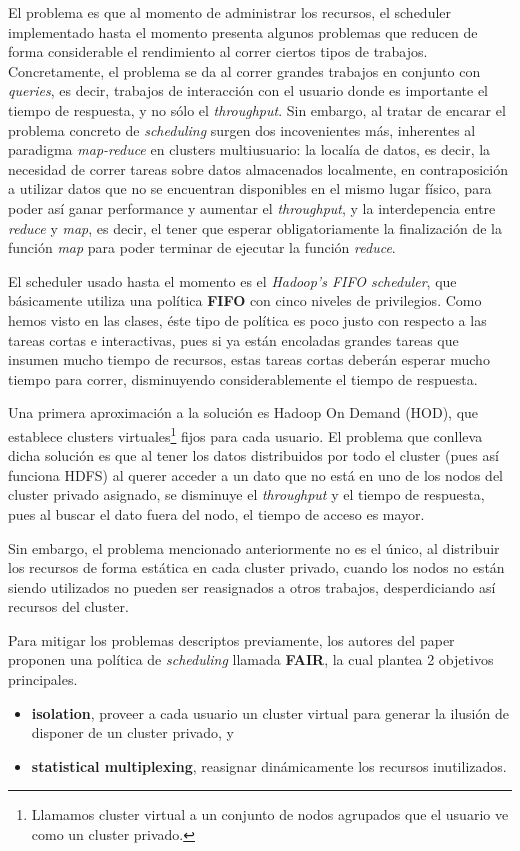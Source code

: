 \documentclass[a4paper]{article}
\begin{document}
El problema es que al momento de administrar los recursos, el scheduler
implementado hasta el momento presenta algunos problemas que reducen de forma
considerable el rendimiento al correr ciertos tipos de trabajos. Concretamente,
el problema se da al correr grandes trabajos en conjunto con \textit{queries},
es decir, trabajos de interacción con el usuario donde es importante el tiempo
de respuesta, y no sólo el \textit{throughput}. Sin embargo, al tratar de
encarar el problema concreto de \textit{scheduling} surgen dos incovenientes
más, inherentes al paradigma \textit{map-reduce} en clusters multiusuario: la
localía de datos, es decir, la necesidad de correr tareas sobre datos
almacenados localmente, en contraposición a utilizar datos que no se encuentran
disponibles en el mismo lugar físico, para poder así ganar performance y
aumentar el \textit{throughput}, y la interdepencia entre \textit{reduce} y
\textit{map}, es decir, el tener que esperar obligatoriamente la finalización
de la función \textit{map} para poder terminar de ejecutar la función
\textit{reduce}.

El scheduler usado hasta el momento es el \textit{Hadoop's FIFO scheduler}, que
básicamente utiliza una política \textbf{FIFO} con cinco niveles de
privilegios.  Como hemos visto en las clases, éste tipo de política es poco
justo con respecto a las tareas cortas e interactivas, pues si ya están
encoladas grandes tareas que insumen mucho tiempo de recursos, estas tareas
cortas deberán esperar mucho tiempo para correr, disminuyendo considerablemente
el tiempo de respuesta.

Una primera aproximación a la solución es Hadoop On Demand (HOD), que establece
clusters virtuales\footnote{Llamamos cluster virtual a un conjunto de nodos
agrupados que el usuario ve como un cluster privado.} fijos para cada usuario.
El problema que conlleva dicha solución es que al tener los datos distribuidos
por todo el cluster (pues así funciona HDFS) al querer acceder a un dato que no
está en uno de los nodos del cluster privado asignado, se disminuye el
\textit{throughput} y el tiempo de respuesta, pues al buscar el dato fuera del
nodo, el tiempo de acceso es mayor.

Sin embargo, el problema mencionado anteriormente no es el único, al distribuir
los recursos de forma estática en cada cluster privado, cuando los nodos no
están siendo utilizados no pueden ser reasignados a otros trabajos,
desperdiciando así recursos del cluster.

Para mitigar los problemas descriptos previamente, los autores del paper
proponen una política de \textit{scheduling} llamada \textbf{FAIR}, la cual
plantea 2 objetivos principales.
\begin{itemize}
  \item \textbf{isolation}, proveer a cada usuario un cluster virtual para
  generar la ilusión de disponer de un cluster privado, y
	\item \textbf{statistical multiplexing}, reasignar dinámicamente los recursos
  inutilizados.
\end{itemize}
\end{document}
